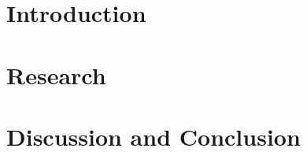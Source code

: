 \documentclass[oneside]{book}
\begin{document}


\epigraphhead[450]{}
\part{Introduction}
\label{part:introduction}




\epigraphhead[450]{}
\part{Research}
\label{part:research}





\epigraphhead[450]{}
\part{Discussion and Conclusion}
\label{part:discussion}




\renewcommand\bibname{References}




\end{document}
